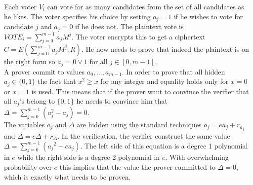 Each voter $V_i$ can vote for as many candidates from the set of all candidates as he likes. The voter specifies his choice by setting $a_j = 1$ if he wishes to vote for candidate $j$ and $a_j = 0$ if he does not. The plaintext vote is $VOTE_i =\sum_{j=0}^{m-1}a_jM^j$. The voter encrypts this to get a ciphertext $C = E(\sum_{j=0}^{m-1}a_jM^j;R)$. He now needs to prove that indeed the plaintext is on the right form so $a_j = 0 \vee 1$ for all $j \in [0,m-1]$. \\

A prover commit to values $a_0, \dots , a_{m-1}$. In order to prove that all hidden $a_j \in \{0, 1\}$  the fact that $x^2 \geq x$ for any integer and equality holds only for $x = 0$ or $x = 1$ is used. This means that if the prover want to convince the verifier that  all $a_j$'s belong to $\{0, 1\}$ he needs to convince him that $\Delta = \sum_{j=0}^{m-1}(a_j^2  - a_j) = 0$.\\

The variables $a_j$ and $\Delta$ are hidden using the standard techniques $\boxed{a_j} = ea_j +r_{a_j}$  and $\boxed{\Delta} = e\Delta+r_\Delta$. In the verification, the verifier construct the same value $\boxed{\Delta} = \sum_{j=0}^{m-1}(\boxed{a_j}^2  - e\boxed{a_j})$. The left side of this equation  is a degree 1 polynomial in $e$ while the right side is a degree 2 polynomial in $e$. With overwhelming probability over $e$ this implies that the value the prover committed to $\Delta =0$, which is exactly what needs to be proven.\\
 
